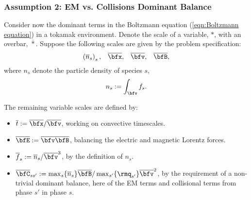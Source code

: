 \subsubsection*{Assumption 2: EM vs. Collisions Dominant Balance}
    Consider now the dominant terms in the Boltzmann equation (\ref{eqn:Boltzmann equation}) in a tokamak environment. Denote the scale of a variable, $*$, with an overbar, $\overline{*}$. Suppose the following scales are given by the problem specification:
    \begin{align}
        \left(\overline{n}_{s}\right)_{s},         &&
        \overline{\bfx},                           &&
        \overline{\bfv},                           &&
        \overline{\bfB},
    \end{align}
    where $n_{s}$ denote the particle density of species $s$,
    \begin{equation}
        n_{s}  :=  \int_{\bfv}f_{s}.
    \end{equation}

    
    The remaining variable scales are defined by:
    \begin{itemize}
        \item  $\overline{t}           :=  \overline{\bfx}/\overline{\bfv}$, working on convective timescales.
        \item  $\overline{\bfE}        :=  \overline{\bfv}\overline{\bfB}$, balancing the electric and magnetic Lorentz forces. 
        \item  $\overline{f}_{s}       :=  \overline{n}_{s}/\overline{\bfv}^{3}$, by the definition of $n_{s}$.
        \item  $\overline{\bfC}_{ss'}  :=  \max_{s}\{\overline{n}_{s}\}\overline{\bfB}/\max_{s'}\{\rmq_{s'}\}\overline{\bfv}^{2}$, by the requirement of a non-trivial dominant balance, here of the EM terms and collisional terms from phase $s'$ in phase $s$. 
    \end{itemize}
    
